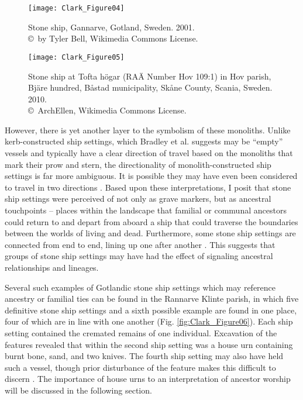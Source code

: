 \begin{figure}[!htb]
	\texttt{[image: Clark\_Figure04]}
	\caption{Stone ship, Gannarve, Gotland, Sweden. 2001.
		{\normalfont\scriptsize \\ \copyright\ by Tyler Bell, Wikimedia Commons License.
	}}
	\label{fig:Clark_Figure04}
\end{figure}

\begin{figure}[!htb]
	\texttt{[image: Clark\_Figure05]}
	\caption{Stone ship at Tofta högar (RAÄ Number Hov 109:1) in Hov parish, Bjäre hundred, Båstad municipality, Skåne County, Scania, Sweden. 2010.
		{\normalfont\scriptsize \\ \copyright\ ArchEllen, Wikimedia Commons License.
	}}
	\label{fig:Clark_Figure05}
\end{figure}

However, there is yet another layer to the symbolism of these monoliths. Unlike kerb-constructed ship settings, which Bradley et al. suggests may be “empty” vessels and typically have a clear direction of travel based on the monoliths that mark their prow and stern, the directionality of monolith-constructed ship settings is far more ambiguous. It is possible they may have even been considered to travel in two directions \parencite[88]{Bradley_2010}.
Based upon these interpretations, I posit that stone ship settings were perceived of not only as grave markers, but as ancestral touchpoints – places within the landscape that familial or communal ancestors could return to and depart from aboard a ship that could traverse the boundaries between the worlds of living and dead. Furthermore, some stone ship settings are connected from end to end, lining up one after another \parencite[84]{Bradley_2010}. This suggests that groups of stone ship settings may have had the effect of signaling ancestral relationships and lineages.

Several such examples of Gotlandic stone ship settings which may reference ancestry or familial ties can be found in the Rannarve Klinte parish, in which five definitive stone ship settings and a sixth possible example are found in one place, four of which are in line with one another (Fig. \ref{fig:Clark_Figure06}).
Each ship setting contained the cremated remains of one individual. Excavation of the features revealed that within the second ship setting was a house urn containing burnt bone, sand, and two knives. The fourth ship setting may also have held such a vessel, though prior disturbance of the feature makes this difficult to discern \parencite[7-26]{Gustavsson_2012}. The importance of house urns to an interpretation of ancestor worship will be discussed in the following section.

